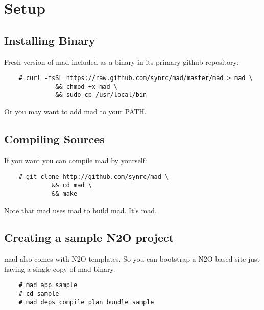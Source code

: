 \section{Setup}

\subsection{Installing Binary}

Fresh version of mad included as a binary in its primary github repository:

\vspace{1\baselineskip}
\begin{lstlisting}
    # curl -fsSL https://raw.github.com/synrc/mad/master/mad > mad \
              && chmod +x mad \
              && sudo cp /usr/local/bin
\end{lstlisting}
\vspace{1\baselineskip}

Or you may want to add mad to your PATH.

\subsection{Compiling Sources}

If you want you can compile mad by yourself:

\vspace{1\baselineskip}
\begin{lstlisting}
    # git clone http://github.com/synrc/mad \
             && cd mad \
             && make
\end{lstlisting}
\vspace{1\baselineskip}

Note that mad uses mad to build mad. It's mad.

\subsection{Creating a sample N2O project}

mad also comes with N2O templates. So you can bootstrap a N2O-based site
just having a single copy of mad binary.

\vspace{1\baselineskip}
\begin{lstlisting}
    # mad app sample
    # cd sample
    # mad deps compile plan bundle sample
\end{lstlisting}
\vspace{1\baselineskip}

